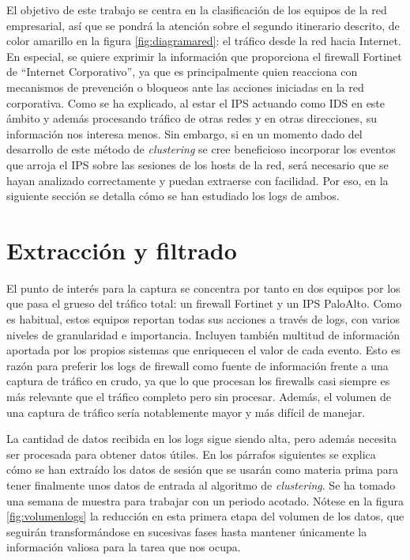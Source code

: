 El objetivo de este trabajo se centra en la clasificación de los equipos de la red empresarial, así que se pondrá la atención sobre el segundo itinerario descrito, de color amarillo en la figura \ref{fig:diagramared}: el tráfico desde la red hacia Internet.
En especial, se quiere exprimir la información que proporciona el firewall Fortinet de ``Internet Corporativo'', ya que es principalmente quien reacciona con mecanismos de prevención o bloqueos ante las acciones iniciadas en la red corporativa.
Como se ha explicado, al estar el IPS actuando como IDS en este ámbito y además procesando tráfico de otras redes y en otras direcciones, su información nos interesa menos.
Sin embargo, si en un momento dado del desarrollo de este método de \emph{clustering} se cree beneficioso incorporar los eventos que arroja el IPS sobre las sesiones de los hosts de la red,
será necesario que se hayan analizado correctamente y puedan extraerse con facilidad.
Por eso, en la siguiente sección se detalla cómo se han estudiado los logs de ambos.

\section{Extracción y filtrado}\label{sec:extraccionyfiltrado}

El punto de interés para la captura se concentra por tanto en dos equipos por los que pasa el grueso del tráfico total: un firewall Fortinet y un IPS PaloAlto.
Como es habitual, estos equipos reportan todas sus acciones a través de logs, con varios niveles de granularidad e importancia.
Incluyen también multitud de información aportada por los propios sistemas que enriquecen el valor de cada evento.
Esto es razón para preferir los logs de firewall como fuente de información frente a una captura de tráfico en crudo, ya que
lo que procesan los firewalls casi siempre es más relevante que el tráfico completo pero sin procesar.
Además, el volumen de una captura de tráfico sería notablemente mayor y más difícil de manejar.

La cantidad de datos recibida en los logs sigue siendo alta, pero además necesita ser procesada para obtener datos útiles.
En los párrafos siguientes se explica cómo se han extraído los datos de sesión que se usarán como materia prima para tener finalmente unos datos de entrada al algoritmo de \emph{clustering}.
Se ha tomado una semana de muestra para trabajar con un periodo acotado.
Nótese en la figura \ref{fig:volumenlogs} la reducción en esta primera etapa del volumen de los datos, que seguirán transformándose en sucesivas fases hasta mantener únicamente la información valiosa para la tarea que nos ocupa.

